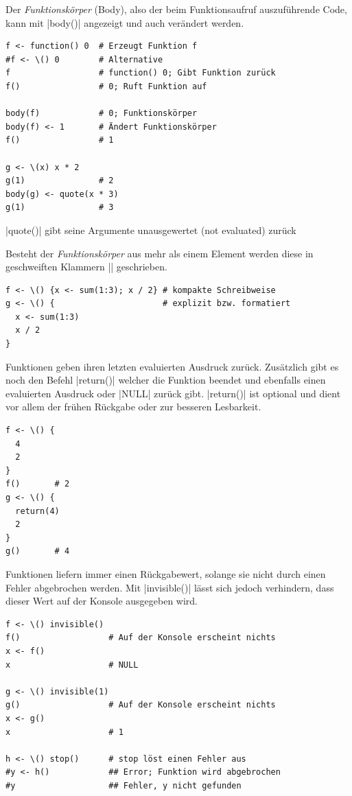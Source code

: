 \documentclass[10pt,twocolumn]{scrartcl}
\renewcommand{\lstinline}{\mycoloredinline}
\begin{document}
Der \emph{Funktionskörper} (Body), also der beim Funktionsaufruf auszuführende Code, kann mit \lstinline|body()| angezeigt und auch verändert werden.

\begin{lstlisting}
f <- function() 0  # Erzeugt Funktion f
#f <- \() 0        # Alternative
f                  # function() 0; Gibt Funktion zurück
f()                # 0; Ruft Funktion auf

body(f)            # 0; Funktionskörper
body(f) <- 1       # Ändert Funktionskörper
f()                # 1

g <- \(x) x * 2
g(1)               # 2
body(g) <- quote(x * 3)
g(1)               # 3
\end{lstlisting}

\lstinline|quote()| gibt seine Argumente unausgewertet (not evaluated) zurück

Besteht der \emph{Funktionskörper} aus mehr als einem Element werden diese in geschweiften Klammern \lstinline|{}| geschrieben.

\begin{lstlisting}
f <- \() {x <- sum(1:3); x / 2} # kompakte Schreibweise
g <- \() {                      # explizit bzw. formatiert
  x <- sum(1:3)
  x / 2
}
\end{lstlisting}

Funktionen geben ihren letzten evaluierten Ausdruck zurück.
Zusätzlich gibt es noch den Befehl \lstinline|return()| welcher die Funktion beendet und ebenfalls einen evaluierten Ausdruck oder \lstinline|NULL| zurück gibt.
\lstinline|return()| ist optional und dient vor allem der frühen Rückgabe oder zur besseren Lesbarkeit.

\begin{lstlisting}
f <- \() {
  4
  2
}
f()       # 2
g <- \() {
  return(4)
  2
}
g()       # 4
\end{lstlisting}

Funktionen liefern immer einen Rückgabewert, solange sie nicht durch einen Fehler abgebrochen werden. Mit \lstinline|invisible()| lässt sich jedoch verhindern, dass dieser Wert auf der Konsole ausgegeben wird.

\begin{lstlisting}
f <- \() invisible()
f()                  # Auf der Konsole erscheint nichts
x <- f()
x                    # NULL

g <- \() invisible(1)
g()                  # Auf der Konsole erscheint nichts
x <- g()
x                    # 1

h <- \() stop()      # stop löst einen Fehler aus
#y <- h()            ## Error; Funktion wird abgebrochen
#y                   ## Fehler, y nicht gefunden
\end{lstlisting}
\end{document}
